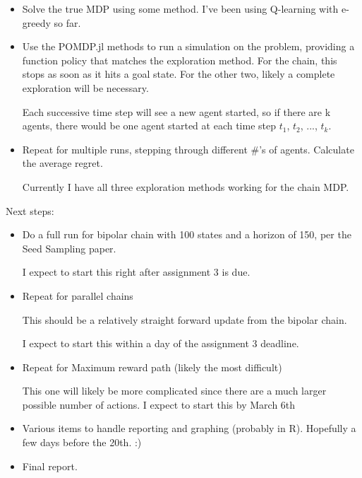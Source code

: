 \documentclass{article}
\begin{document}
  \begin{itemize}
  
\item Solve the true MDP using some method. I've been using Q-learning with e-greedy so far.
  
\item Use the POMDP.jl methods to run a simulation on the problem, providing a function policy that matches the exploration method. For the chain, this stops as soon as it hits a goal state. For the other two, likely a complete exploration will be necessary.

Each successive time step will see a new agent started, so if there are k agents, there would be one agent started at each time step $t_1$, $t_2$, ..., $t_k$.
\item Repeat for multiple runs, stepping through different \#'s of agents. Calculate the average regret.

  
  Currently I have all three exploration methods working for the chain MDP.
  
 \end{itemize}
  Next steps:
  \begin{itemize}
\item Do a full run for bipolar chain with 100 states and a horizon of 150, per the Seed Sampling paper.

I expect to start this right after assignment 3 is due.

\item Repeat for parallel chains

This should be a relatively straight forward update from the bipolar chain.  

I expect to start this within a day of the assignment 3 deadline.

\item Repeat for Maximum reward path (likely the most difficult)

This one will likely be more complicated since there are a much larger possible number of actions. I expect to start this by March 6th

\item Various items to handle reporting and graphing (probably in R). Hopefully a few days before the 20th. :)

\item Final report.
 \end{itemize}

    
\end{document}
